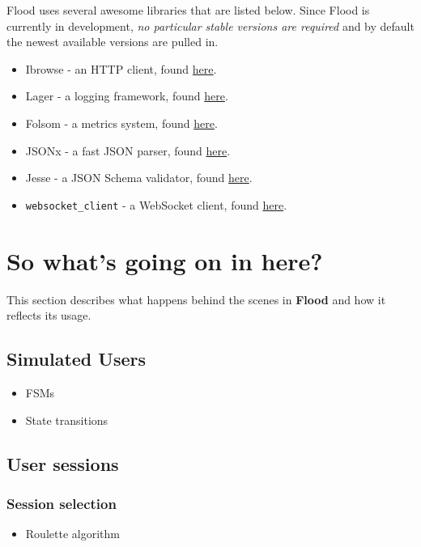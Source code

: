 \documentclass[a4paper]{article}
\begin{document}
Flood uses several awesome libraries that are listed below. Since Flood is currently in development, \emph{no particular stable versions are required} and by default the newest available versions are pulled in.


\begin{itemize}
\item Ibrowse - an HTTP client, found \href{https://github.com/cmullaparthi/ibrowse}{here}.
\item Lager - a logging framework, found \href{https://github.com/basho/lager}{here}.
\item Folsom - a metrics system, found \href{https://github.com/boundary/folsom}{here}.
\item JSONx - a fast JSON parser, found \href{https://github.com/iskra/jsonx}{here}.
\item Jesse - a JSON Schema validator, found \href{https://github.com/alertlogic/jesse}{here}.
\item \texttt{websocket\_client} - a WebSocket client, found \href{https://github.com/jeremyong/websocket_client}{here}.
\end{itemize}

\pagebreak
\section{So what's going on in here?}
\label{sec-2}

This section describes what happens behind the scenes in \textbf{Flood} and how it reflects its usage.
\subsection{Simulated Users}
\label{sec-2-1}


\begin{itemize}
\item FSMs
\item State transitions
\end{itemize}
\subsection{User sessions}
\label{sec-2-2}
\label{ref-sessions}
\subsubsection{Session selection}
\label{sec-2-2-1}


\begin{itemize}
\item Roulette algorithm
\end{itemize}
\end{document}
